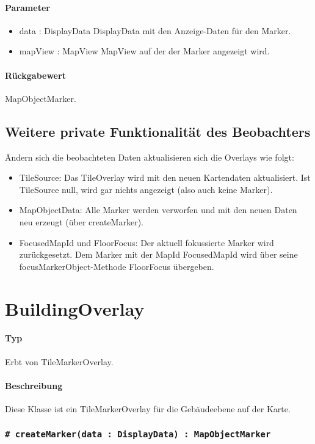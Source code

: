 \paragraph*{Parameter}
\begin{itemize}
    \item data : DisplayData DisplayData mit den Anzeige-Daten für den Marker.
    \item mapView : MapView MapView auf der der Marker angezeigt wird.
\end{itemize}
\paragraph*{Rückgabewert}
MapObjectMarker.


\subsection{Weitere private Funktionalität des Beobachters}
Ändern sich die beobachteten Daten aktualisieren sich die Overlays wie folgt:
\begin{itemize}
    \item TileSource: Das TileOverlay wird mit den neuen Kartendaten aktualisiert.
    Ist TileSource null, wird gar nichts angezeigt (also auch keine Marker).
    \item MapObjectData: Alle Marker werden verworfen und mit den neuen Daten neu erzeugt (über createMarker).
    \item FocusedMapId und FloorFocus: Der aktuell fokussierte Marker wird zurückgesetzt.
    Dem Marker mit der MapId FocusedMapId wird über seine focusMarkerObject-Methode FloorFocus übergeben.
\end{itemize}

\section{BuildingOverlay}
\paragraph*{Typ}
Erbt von TileMarkerOverlay.
\paragraph*{Beschreibung}
Diese Klasse ist ein TileMarkerOverlay für die Gebäudeebene auf der Karte.

\subsubsection{\texttt{\# createMarker(data : DisplayData) : MapObjectMarker}}%
